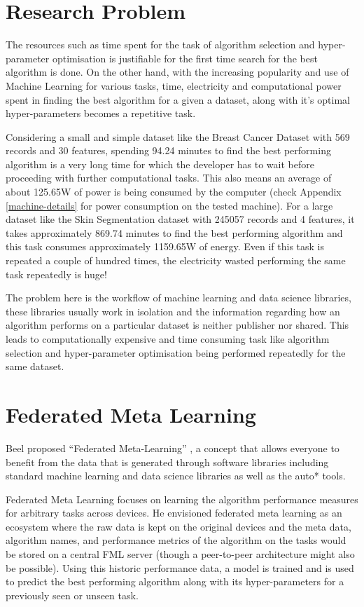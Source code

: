 \section{Research Problem}
The resources such as time spent for the task of algorithm selection and hyper-parameter optimisation is justifiable for the first time search for the best algorithm is done. On the other hand, with the increasing popularity and use of Machine Learning for various tasks, time, electricity and computational power spent in finding the best algorithm for a given a dataset, along with it's optimal hyper-parameters becomes a repetitive task. 

Considering a small and simple dataset like the Breast Cancer Dataset with 569 records and 30 features, spending 94.24 minutes to find the best performing algorithm is a very long time for which the developer has to wait before proceeding with further computational tasks. This also means an average of about 125.65W of power is being consumed by the computer (check Appendix \ref{machine-details} for power consumption on the tested machine). For a large dataset like the Skin Segmentation dataset with 245057 records and 4 features, it takes approximately 869.74 minutes to find the best performing algorithm and this task consumes approximately 1159.65W of energy. Even if this task is repeated a couple of hundred times, the electricity wasted performing the same task repeatedly is huge!

The problem here is the workflow of machine learning and data science libraries, these libraries usually work in isolation and the information regarding how an algorithm performs on a particular dataset is neither publisher nor shared. This leads to computationally expensive and time consuming task like algorithm selection and hyper-parameter optimisation being performed repeatedly for the same dataset.

\section{Federated Meta Learning}
Beel proposed “Federated Meta-Learning” \citep{fml}, a concept that allows everyone to benefit from the data that is generated through software libraries including standard machine learning and data science libraries as well as the auto* tools. 

Federated Meta Learning focuses on learning the algorithm performance measures for arbitrary tasks across devices. He envisioned federated meta learning as an ecosystem where the raw data is kept on the original  devices and the meta data, algorithm names, and performance metrics of the algorithm on the tasks would be stored on a central FML server (though a peer-to-peer architecture might also be possible). Using this historic performance data, a model is trained and is used to predict the best performing algorithm along with its hyper-parameters for a previously seen or unseen task.


